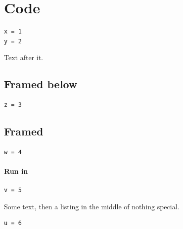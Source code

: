 \documentclass{article}
\begin{document}
\section{Code}
\begin{lstlisting}
x = 1
y = 2
\end{lstlisting}
Text after it.
\subsection{Framed below}
\begin{lstlisting}[frame=b]
z = 3
\end{lstlisting}
\subsection{Framed}
\begin{lstlisting}[frame=single]
w = 4
\end{lstlisting}
\paragraph{Run in}
\begin{lstlisting}
v = 5
\end{lstlisting}
Some text, then a listing in the middle of nothing special.
\begin{lstlisting}
u = 6
\end{lstlisting}
\end{document}
